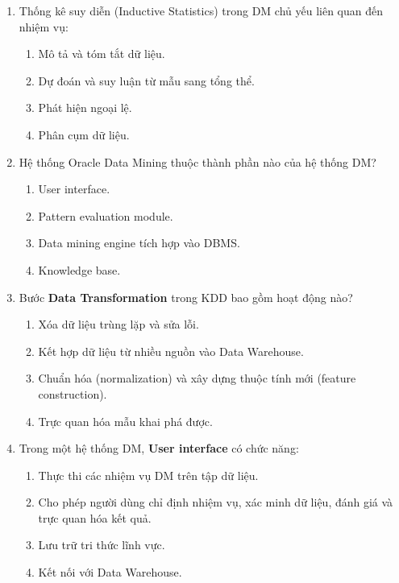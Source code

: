 \documentclass[10pt]{article}
\begin{document}
\begin{enumerate}[leftmargin=*, label=\textbf{Câu \arabic*.}]
    \item Thống kê suy diễn (Inductive Statistics) trong DM chủ yếu liên quan đến nhiệm vụ:
    \begin{enumerate}[label=\Alph*.]
        \item Mô tả và tóm tắt dữ liệu.
        \item Dự đoán và suy luận từ mẫu sang tổng thể.
        \item Phát hiện ngoại lệ.
        \item Phân cụm dữ liệu.
    \end{enumerate}

    \item Hệ thống Oracle Data Mining thuộc thành phần nào của hệ thống DM?
    \begin{enumerate}[label=\Alph*.]
        \item User interface.
        \item Pattern evaluation module.
        \item Data mining engine tích hợp vào DBMS.
        \item Knowledge base.
    \end{enumerate}

    \item Bước \textbf{Data Transformation} trong KDD bao gồm hoạt động nào?
    \begin{enumerate}[label=\Alph*.]
        \item Xóa dữ liệu trùng lặp và sửa lỗi.
        \item Kết hợp dữ liệu từ nhiều nguồn vào Data Warehouse.
        \item Chuẩn hóa (normalization) và xây dựng thuộc tính mới (feature construction).
        \item Trực quan hóa mẫu khai phá được.
    \end{enumerate}

    \item Trong một hệ thống DM, \textbf{User interface} có chức năng:
    \begin{enumerate}[label=\Alph*.]
        \item Thực thi các nhiệm vụ DM trên tập dữ liệu.
        \item Cho phép người dùng chỉ định nhiệm vụ, xác minh dữ liệu, đánh giá và trực quan hóa kết quả.
        \item Lưu trữ tri thức lĩnh vực.
        \item Kết nối với Data Warehouse.
    \end{enumerate}


\end{enumerate}
\end{document}
